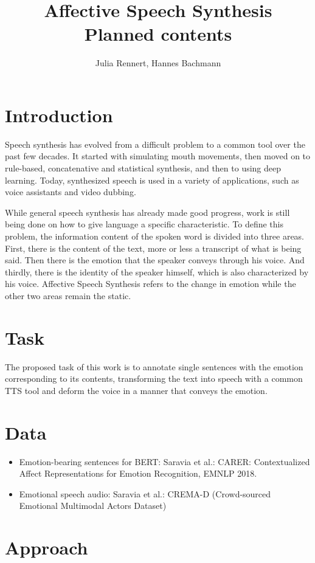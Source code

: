 \documentclass[12pt]{article}
\title{Affective Speech Synthesis \\ \large{Planned contents}}
\author{Julia Rennert, Hannes Bachmann}
\begin{document}
\maketitle

\section{Introduction}
Speech synthesis has evolved from a difficult problem to a common tool over the past few decades. It started with simulating mouth movements, then moved on to rule-based, concatenative and statistical synthesis, and then to using deep learning. Today, synthesized speech is used in a variety of applications, such as voice assistants and video dubbing.

While general speech synthesis has already made good progress, work is still being done on how to give language a specific characteristic. To define this problem, the information content of the spoken word is divided into three areas. First, there is the content of the text, more or less a transcript of what is being said. Then there is the emotion that the speaker conveys through his voice. And thirdly, there is the identity of the speaker himself, which is also characterized by his voice. Affective Speech Synthesis refers to the change in emotion while the other two areas remain the static.

\section{Task}
The proposed task of this work is to annotate single sentences with the emotion corresponding to its contents, transforming the text into speech with a common TTS tool and deform the voice in a manner that conveys the emotion.

\section{Data}
\begin{itemize}
\item Emotion-bearing sentences for BERT: Saravia et al.: CARER: Contextualized Affect Representations for Emotion Recognition, EMNLP 2018. 
\item Emotional speech audio: Saravia et al.: CREMA-D (Crowd-sourced Emotional Multimodal Actors Dataset)
\end{itemize}
\section{Approach}
\end{document}
